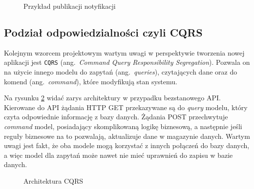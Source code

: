 \begin{figure}[h]
	\centering
	\caption{Przykład publikacji notyfikacji}
	\label{fig:mediatR-Event}
\end{figure}

\subsection{Podział odpowiedzialności czyli CQRS}
\label{subsec:cqrs}

Kolejnym wzorcem projektowym wartym uwagi w perspektywie tworzenia nowej aplikacji jest \texttt{CQRS} (ang.~\emph{Command Query Responsibility Segregation}). Pozwala on na użycie innego modelu do zapytań (ang.~\emph{queries}), czytających dane oraz do komend (ang.~\emph{command}), które modyfikują stan systemu. 

Na rysunku \ref{fig:cqrs-architecture} widać zarys architektury w przypadku bezstanowego API. Kierowane do API żądania HTTP GET przekazywane są do \emph{query} modelu, który czyta odpowiednie informację z bazy danych. Żądania POST przechwytuje \emph{command} model, posiadający skomplikowaną logikę biznesową, a następnie jeśli reguły biznesowe na to pozwalają, aktualizuje dane w magazynie danych. Wartym uwagi jest fakt, że oba modele mogą korzystać z innych połączeń do bazy danych, a więc model dla zapytań może nawet nie mieć uprawnień do zapisu w bazie danych. 

\begin{figure}[h]
	\centering
	\caption{Architektura CQRS}
	\label{fig:cqrs-architecture}
\end{figure}

